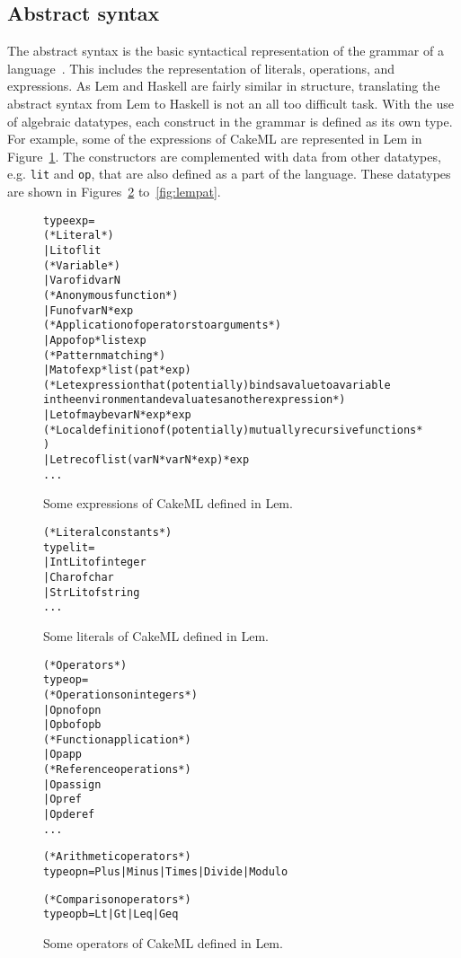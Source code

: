 \subsection{Abstract syntax}
\label{strict:abs}
The abstract syntax is the basic syntactical representation of the grammar of a
language~\cite{pltbook}. This includes the representation of literals,
operations, and expressions. As Lem and Haskell are fairly similar in
structure, translating the abstract syntax from Lem to Haskell is not an all too
difficult task. With the use of algebraic datatypes, each construct in the grammar is
defined as its own type. For example, some of the expressions of CakeML
are represented in Lem in Figure~\ref{fig:lemexp}.
The constructors are complemented with data from other datatypes,
e.g. \texttt{lit} and \texttt{op}, that are also defined as a part of the
language. These datatypes are shown in Figures~\ref{fig:lemlit}
to~\ref{fig:lempat}.

\begin{figure}
\begin{alltt}
  type exp =
    (* Literal *)
    | Lit of lit
    (* Variable *)
    | Var of id varN
    (* Anonymous function *)
    | Fun of varN * exp
    (* Application of operators to arguments *)
    | App of op * list exp
    (* Pattern matching *)
    | Mat of exp * list (pat * exp)
    (* Let expression that (potentially) binds a value to a variable
       in the environment and evaluates another expression *)
    | Let of maybe varN * exp * exp
    (* Local definition of (potentially) mutually recursive functions *)
    | Letrec of list (varN * varN * exp) * exp
    ...
\end{alltt}
\caption{Some expressions of CakeML defined in Lem.}
\label{fig:lemexp}
\end{figure}

\begin{figure}
\begin{alltt}
  (* Literal constants *)
  type lit =
    | IntLit of integer
    | Char of char
    | StrLit of string
    ...
\end{alltt}
\caption{Some literals of CakeML defined in Lem.}
\label{fig:lemlit}
\end{figure}

\begin{figure}
\begin{alltt}
  (* Operators *)
  type op =
    (* Operations on integers *)
    | Opn of opn
    | Opb of opb
    (* Function application *)
    | Opapp
    (* Reference operations *)
    | Opassign
    | Opref
    | Opderef
    ...


  (* Arithmetic operators *)
  type opn = Plus | Minus | Times | Divide | Modulo

  (* Comparison operators *)
  type opb = Lt | Gt | Leq | Geq
\end{alltt}
\caption{Some operators of CakeML defined in Lem.}
\label{fig:lemop}
\end{figure}


